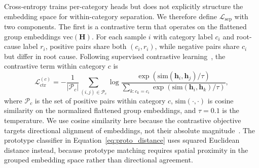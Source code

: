 Cross-entropy trains per-category heads but does not explicitly structure the embedding space for within-category separation. We therefore define $\mathcal{L}_{\text{sep}}$ with two components. The first is a contrastive term that operates on the flattened group embeddings $\text{vec}(\mathbf{H})$. For each sample $i$ with category label $c_i$ and root-cause label $r_i$, positive pairs share both $(c_i, r_i)$, while negative pairs share $c_i$ but differ in root cause. Following supervised contrastive learning~\cite{khosla2020supervised}, the contrastive term within category $c$ is
\begin{equation}
\mathcal{L}_{\text{ctr}}^{(c)} = -\frac{1}{|\mathcal{P}_c|} \sum_{(i,j) \in \mathcal{P}_c} \log \frac{\exp(\text{sim}(\mathbf{h}_i, \mathbf{h}_j) / \tau)}{\sum_{k : c_k = c_i} \exp(\text{sim}(\mathbf{h}_i, \mathbf{h}_k) / \tau)},
\label{eq:contrastive}
\end{equation}
where $\mathcal{P}_c$ is the set of positive pairs within category $c$, $\text{sim}(\cdot, \cdot)$ is cosine similarity on the normalized flattened group embeddings, and $\tau = 0.1$ is the temperature. We use cosine similarity here because the contrastive objective targets directional alignment of embeddings, not their absolute magnitude~\cite{wang2021understanding,islam2023self}. The prototype classifier in Equation~\ref{eq:proto_distance} uses squared Euclidean distance instead, because prototype matching requires spatial proximity in the grouped embedding space rather than directional agreement.

